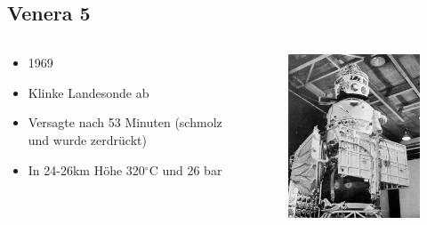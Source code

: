 \documentclass{beamer}
\begin{document}
	\subsection{Venera 5}
	\begin{frame}
		\begin{columns}
			\begin{column}{0.5\textwidth}
				\begin{itemize}
					\item 1969
					\item Klinke Landesonde ab
					\item Versagte nach 53 Minuten (schmolz und wurde zerdrückt)
					\item In 24-26km Höhe 320$^\circ$C und 26 bar
				\end{itemize}
			\end{column}
			\begin{column}{0.4\textwidth}
				\begin{figure}[ht]
					\includegraphics[scale=0.4]{./images/venera_5}
				\end{figure}
			\end{column}
		\end{columns}
	\end{frame}
\end{document}
